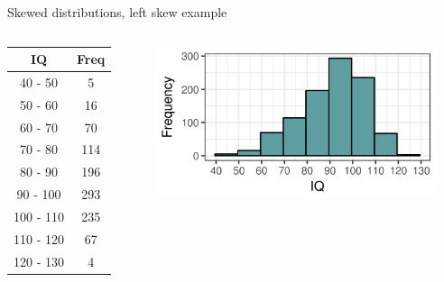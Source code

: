 \documentclass[xcolor=table, aspectratio=169, bigger, handout]{beamer}
\begin{document}
\begin{frame}{Skewed distributions, left skew example}

\begin{columns}
\begin{column}{0.35\textwidth}
\begin{exampleblock}{}
\begin{center}
\begin{tabular}{cc}
IQ & Freq \\
\hline
40 - 50 & 5 \\
50 - 60 & 16 \\
60 - 70 & 70 \\
70 - 80 & 114 \\
80 - 90 & 196 \\
90 - 100 & 293 \\
100 - 110 & 235 \\
110 - 120 & 67 \\
120 - 130 & 4 \\
\end{tabular}
\end{center}
\end{exampleblock}
\end{column}
\pause
\begin{column}{0.65\textwidth}
\begin{center}
\includegraphics[width=3.25in]{../images/wk04_iq_left_hist}

\end{center}
\end{column}
\end{columns}

\end{frame}
\end{document}
